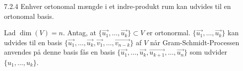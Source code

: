 \begin{korollar}{7.2.4}
	Enhver ortonomal mængde i et indre-produkt rum kan udvides til en ortonomal 
	basis.
\end{korollar}

\begin{bevis}
	Lad $\dim(V) = n$. Antag, at $\{\vec{u_1}, \dotsc, \vec{u_k}\} \subset V$ 
	er ortonormal. $\{\vec{u_1}, \dotsc, \vec{u_k}\}$ kan udvides til en basis
	$\{\vec{u_1}, \dotsc, \vec{u_k}, \vec{v_1}, \dotsc, \vec{v_{n-k}}\}$ af $V$
	når Gram-Schmidt-Processen anvendes på denne basis fås en basis
	$\{\vec{u_1}, \dotsc, \vec{u_k}, \vec{u_{k+1}}, \dotsc, \vec{u_{n}}\}$ som
	udvider $\{u_1, \dotsc, u_k\}$.
\end{bevis}
